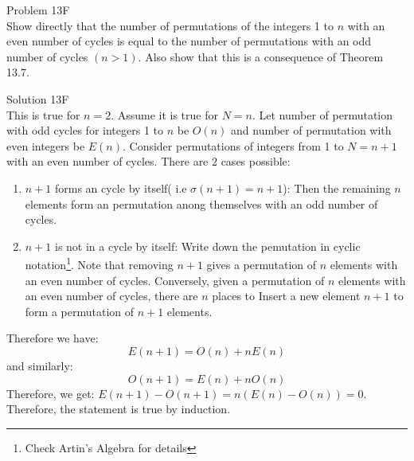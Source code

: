 \documentclass{tufte-book}
\begin{document}
\begin{tcolorbox}[colback=blue!10!white]
	\large{Problem 13F}\\
	Show directly that the number of permutations of
the integers 1 to $n$ with an even number of cycles is equal to the
number of permutations with an odd number of cycles $(n > 1)$.
Also show that this is a consequence of Theorem 13.7.
\end{tcolorbox}
\large{Solution 13F}\\
This is true for $n=2$. Assume it is true for $N=n$. Let number of permutation with odd cycles for integers 1 to $n$ be $O(n)$ and number of permutation with even integers be $E(n)$. Consider permutations of integers from 1 to $N=n+1$ with an even number of cycles. There are 2 cases possible:
\begin{enumerate}
	\item $n+1$ forms an cycle by itself( i.e $\sigma(n+1)=n+1$): Then the remaining $n$ elements form an permutation anong themselves with an odd number of cycles. 
	\item $n+1$ is not in a cycle by itself: Write down the pemutation in cyclic notation\footnote{Check Artin's Algebra for details}. Note that removing $n+1$ gives a permutation of $n$ elements with an even number of cycles. Conversely, given a  permutation of $n$ elements with an even number of cycles, there are $n$ places to Insert a new element $n+1$ to form a permutation of $n+1$ elements. 
\end{enumerate} 
Therefore we have:
$$E(n+1)=O(n)+nE(n)$$
and similarly:
$$O(n+1)=E(n)+nO(n)$$
Therefore, we get:  $E(n+1)-O(n+1)=n\left(E(n)-O(n)\right)=0$. Therefore, the statement is true by induction.






\backmatter




\end{document}
